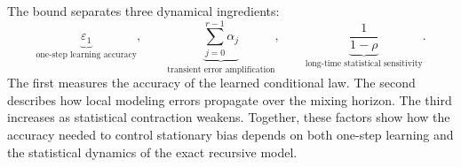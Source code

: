 \documentclass[final,hidelinks]{siamart251216}
\begin{document}
The bound separates three dynamical ingredients:
\[
    \underbrace{\varepsilon_1}_{\text{one-step learning accuracy}},
    \qquad
    \underbrace{\sum_{j=0}^{r-1}\alpha_j}_{
        \text{transient error amplification}},
    \qquad
    \underbrace{\frac{1}{1-\rho}}_{
        \text{long-time statistical sensitivity}}.
\]
The first measures the accuracy of the learned conditional law. The
second describes how local modeling errors propagate over the mixing
horizon. The third increases as statistical contraction weakens.
Together, these factors show how the accuracy needed to control
stationary bias depends on both one-step learning and the statistical
dynamics of the exact recursive model.



\end{document}
